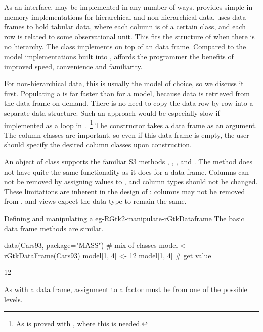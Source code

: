 As an interface,  may be implemented in any number
of ways. \GTK\/ provides simple in-memory implementations for
hierarchical and non-hierarchical data.  \R\/ uses data frames to hold
tabular data, where each column is of a certain class, and each row is
related to some observational unit. This fits the structure of
 when there is no hierarchy.  The
 class implements  on top of
an \R\/ data frame. Compared to the model implementations built into
\GTK,  affords the \R\/ programmer the benefits
of improved speed, convenience and familiarity.

For non-hierarchical data, this is
usually the model of choice, so we discuss it first. Populating a
 is far faster than for a \GTK\/ model, because
data is retrieved from the data frame on demand. There is no need to
copy the data row by row into a separate data structure. Such an
approach would be especially slow if implemented as a loop in
\R.~\footnote{As is proved with , where this is needed.} The constructor
 takes a
data frame as an argument. The column classes are important, so even
if this data frame is empty, the user should specify the desired
column classes upon construction.

An object of class  supports the familiar S3
methods \method{[}{RGtkDataFrame}, \method{[\ASSIGN}{RGtkDataFrame},
, and
. The \code{[$<$-} method does
not have quite the same functionality as it does for a data
frame. Columns can not be removed by assigning values to ,
and column types should not be changed. These limitations are inherent
in the design of \GTK: columns may not be removed from
, and views expect the data type to remain the
same.

\begin{example}{Defining and manipulating a }{eg-RGtk2-manipulate-rGtkDataframe}
  The basic data frame methods are similar.
\begin{Schunk}
\begin{Sinput}
 data(Cars93, package="MASS")             # mix of classes
 model <- rGtkDataFrame(Cars93)
 model[1, 4] <- 12
 model[1, 4]                              # get value
\end{Sinput}
\begin{Soutput}
[1] 12
\end{Soutput}
\end{Schunk}
%
As with a data frame, assignment to a factor must be from one of the
possible levels.

\end{example}

